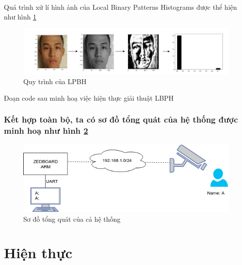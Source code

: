 \documentclass[a4paper]{report}
\begin{document}
%
Quá trình xử lí hình ảnh của Local Binary Patterns Histograms được thể hiện như hình \ref{fig:thietke3}
%
\begin{figure}[H]
\centering
\includegraphics[scale=.5]{../images/fig/thietke3.png}
\caption{Quy trình của LPBH}
\label{fig:thietke3}
\end{figure}
%
Đoạn code sau minh hoạ việc hiện thực giải thuật LBPH\\
 

 
  
\subsubsection*{Kết hợp toàn bộ, ta có sơ đồ tổng quát của hệ thống được minh hoạ như hình \ref{fig:thietke1}}
%
\begin{figure}[H]
\centering
\includegraphics[scale=.5]{../images/fig/thietke1.png}
\caption{Sơ đồ tổng quát của cả hệ thống}
\label{fig:thietke1}
\end{figure}
%
\section{Hiện thực}
\end{document}
